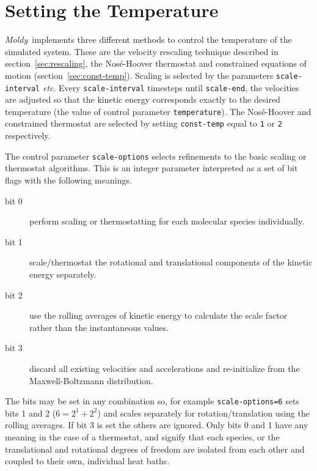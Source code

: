 \documentclass[twoside]{report}
\newcommand{\moldy}{{\em Moldy}}
\newcommand{\etc}{{\em etc}}
\begin{document}
\section{Setting the Temperature}%

\moldy\ implements three different methods to control the temperature
of the simulated system. These are the velocity rescaling technique
described in section~\ref{sec:rescaling}, the Nos\'e-Hoover thermostat
and constrained equations of motion (section~\ref{sec:const-temp}).
Scaling is selected by the parameters \texttt{scale-interval} \etc.
Every \texttt{scale-interval} timesteps until \texttt{scale-end}, the
velocities are adjusted so that the kinetic energy corresponds exactly
to the desired temperature (the value of control parameter
\texttt{temperature}).  The Nos\'e-Hoover and constrained thermostat
are selected by setting \texttt{const-temp} equal to \texttt{1} or
\texttt{2} respectively.

The control parameter \texttt{scale-options} selects refinements to
the basic scaling or thermostat algorithms. This is an integer
parameter interpreted as a set of bit flags with the following meanings.
\begin{description}
\item[bit 0]    perform scaling or thermostatting for each molecular species individually.
\item[bit 1]    scale/thermostat the rotational and translational components of
the kinetic energy separately.
\item[bit 2]    use the rolling averages of kinetic energy to
calculate the scale factor rather than the instantaneous values.
\item[bit 3]    discard all existing velocities and accelerations and
re-initialize from the Maxwell-Boltzmann distribution.
\end{description}
The bits may be set in any combination so, for example
\texttt{scale-options=6} sets bits 1 and 2 ($ 6 = 2^1 + 2^2$) and scales
separately for rotation/translation using the rolling averages.  If
bit 3 is set the others are ignored.  Only bits 0 and 1 have any
meaning in the case of a thermostat, and signify that each species, or
the translational and rotational degrees of freedom are isolated from
each other and coupled to their own, individual heat baths.
\end{document}
